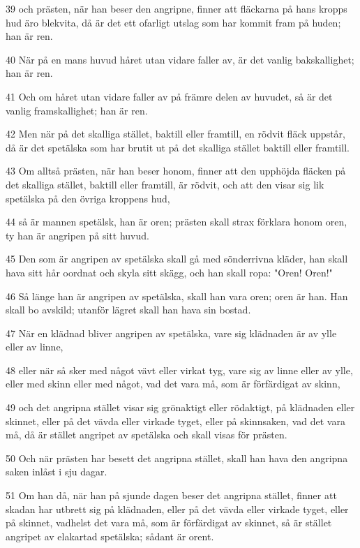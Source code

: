 \par 39 och prästen, när han beser den angripne, finner att fläckarna på hans kropps hud äro blekvita, då är det ett ofarligt utslag som har kommit fram på huden; han är ren.
\par 40 När på en mans huvud håret utan vidare faller av, är det vanlig bakskallighet; han är ren.
\par 41 Och om håret utan vidare faller av på främre delen av huvudet, så är det vanlig framskallighet; han är ren.
\par 42 Men när på det skalliga stället, baktill eller framtill, en rödvit fläck uppstår, då är det spetälska som har brutit ut på det skalliga stället baktill eller framtill.
\par 43 Om alltså prästen, när han beser honom, finner att den upphöjda fläcken på det skalliga stället, baktill eller framtill, är rödvit, och att den visar sig lik spetälska på den övriga kroppens hud,
\par 44 så är mannen spetälsk, han är oren; prästen skall strax förklara honom oren, ty han är angripen på sitt huvud.
\par 45 Den som är angripen av spetälska skall gå med sönderrivna kläder, han skall hava sitt hår oordnat och skyla sitt skägg, och han skall ropa: "Oren! Oren!"
\par 46 Så länge han är angripen av spetälska, skall han vara oren; oren är han. Han skall bo avskild; utanför lägret skall han hava sin bostad.
\par 47 När en klädnad bliver angripen av spetälska, vare sig klädnaden är av ylle eller av linne,
\par 48 eller när så sker med något vävt eller virkat tyg, vare sig av linne eller av ylle, eller med skinn eller med något, vad det vara må, som är förfärdigat av skinn,
\par 49 och det angripna stället visar sig grönaktigt eller rödaktigt, på klädnaden eller skinnet, eller på det vävda eller virkade tyget, eller på skinnsaken, vad det vara må, då är stället angripet av spetälska och skall visas för prästen.
\par 50 Och när prästen har besett det angripna stället, skall han hava den angripna saken inlåst i sju dagar.
\par 51 Om han då, när han på sjunde dagen beser det angripna stället, finner att skadan har utbrett sig på klädnaden, eller på det vävda eller virkade tyget, eller på skinnet, vadhelst det vara må, som är förfärdigat av skinnet, så är stället angripet av elakartad spetälska; sådant är orent.
